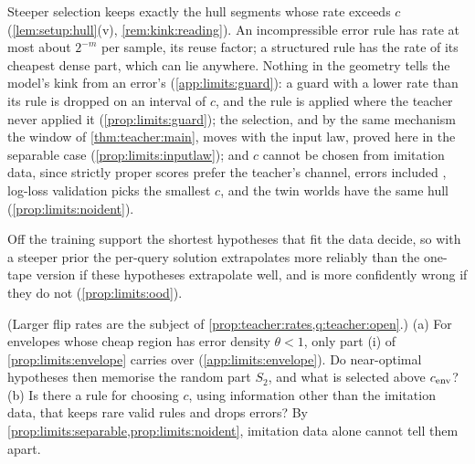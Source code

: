 \begin{remark}\label{rem:limits:hull}
Steeper selection keeps exactly the hull segments whose rate exceeds $c$ (\cref{lem:setup:hull}(v), \cref{rem:kink:reading}). An incompressible error rule has rate at most about $2^{-m}$ per sample, its reuse factor; a structured rule has the rate of its cheapest dense part, which can lie anywhere. Nothing in the geometry tells the model's kink from an error's (\cref{app:limits:guard}): a guard with a lower rate than its rule is dropped on an interval of $c$, and the rule is applied where the teacher never applied it (\cref{prop:limits:guard}); the selection, and by the same mechanism the window of \cref{thm:teacher:main}, moves with the input law, proved here in the separable case (\cref{prop:limits:inputlaw}); and $c$ cannot be chosen from imitation data, since strictly proper scores prefer the teacher's channel, errors included \citep{gneiting2007strictly}, log-loss validation picks the smallest $c$, and the twin worlds have the same hull (\cref{prop:limits:noident}).
\end{remark}

Off the training support the shortest hypotheses that fit the data decide, so with a steeper prior the per-query solution extrapolates more reliably than the one-tape version if these hypotheses extrapolate well, and is more confidently wrong if they do not (\cref{prop:limits:ood}).

\begin{question}\label{q:limits:open}
(Larger flip rates are the subject of \cref{prop:teacher:rates,q:teacher:open}.) (a) For envelopes whose cheap region has error density $\theta<1$, only part (i) of \cref{prop:limits:envelope} carries over (\cref{app:limits:envelope}). Do near-optimal hypotheses then memorise the random part $S_2$, and what is selected above $c_{\rm env}$? (b) Is there a rule for choosing $c$, using information other than the imitation data, that keeps rare valid rules and drops errors? By \cref{prop:limits:separable,prop:limits:noident}, imitation data alone cannot tell them apart.
\end{question}
